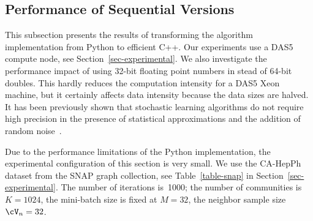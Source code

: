 \subsection{Performance of Sequential Versions}
\label{sec-seq-performance}

This subsection presents the results of transforming the algorithm
implementation from Python to efficient C++.
Our experiments use a DAS5 compute node, see Section~\ref{sec-experimental}.
%
We also investigate the performance impact of using
32-bit floating point numbers in stead of 64-bit doubles.
This hardly reduces the computation intensity for a DAS5 Xeon machine, but
it certainly affects data intensity because the data sizes are halved.
It has been previously shown that stochastic learning algorithms do not require
high precision in the presence of statistical approximations and the addition
of random noise~\cite{DBLP:journals/corr/GuptaAGN15}.
%

Due to the performance limitations of the Python implementation, the
experimental configuration of this section is very small.
%
We use the CA-HepPh dataset from the SNAP graph collection, see
Table~\ref{table-snap} in Section~\ref{sec-experimental}. The number of
iterations is~1000;
the number of communities is $K=1024$, the mini-batch size is fixed at $M=32$, the
neighbor sample size $\Neighbors=32$.

\begin{comment}
******** Unnecessary detail?
The mini-batch sampling as described in Section~\ref{sec-background} randomly
chooses either a mini-batch of link edges, whose size is the degree of one
randomly selected vertex, or a mini-batch of nonlink edges, whose size is
specified as a model parameter. In this evaluation, we only select batches
of nonlink edges because that makes the mini-batch size, and hence the
execution times, deterministic. We separately validated that the time spent
\textit{per mini-batch vertex} for samples of link edges and nonlink edges
is fully consistent.
\end{comment}

